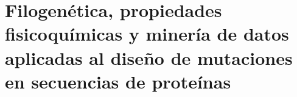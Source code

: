 \chapter{Filogenética, propiedades fisicoquímicas y minería de datos aplicadas al diseño de mutaciones en secuencias de proteínas}

\ifpdf
    \graphicspath{{Chapter4/Figs/Raster/}{Chapter4/Figs/PDF/}{Chapter4/Figs/}}
\else
    \graphicspath{{Chapter4/Figs/Vector/}{Chapter4/Figs/}}
\fi
